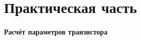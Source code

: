 



\label{sec:theory}
\section{Практическая часть}%
\label{sec:practice}
\paragraph{Расчёт параметров транзистора}%
